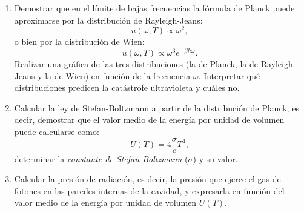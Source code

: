 \documentclass[a4paper,11pt]{article}
\begin{document}
\begin{enumerate}[label=(\alph*),
                  leftmargin=2\parindent,
                  rightmargin=2\parindent]
     \item{Demostrar que en el límite de bajas frecuencias la fórmula de 
           Planck puede aproximarse por la distribución de Rayleigh-Jeans:
           $$ u(\omega, T) \propto \omega^2, $$
           o bien por la distribución de Wien:
           $$ u(\omega, T) \propto \omega^3 e^{-\beta \hbar \omega}. $$
           Realizar una gráfica de las tres distribuciones (la de Planck, la 
           de Rayleigh-Jeans y la de Wien) en función de la frecuencia 
           $\omega$.
           Interpretar qué distribuciones predicen la catástrofe 
           ultravioleta y cuáles no.
           }
     
     \item{Calcular la ley de Stefan-Boltzmann a partir de la distribución 
           de Planck, es decir, demostrar que el valor medio de la energía 
           por unidad de volumen puede calcularse como:
           $$ U(T) = 4 \frac{\sigma}{c} T^4, $$
           determinar la \emph{constante de Stefan-Boltzmann} ($\sigma$) y su 
           valor.
           }
     
     \item{Calcular la presión de radiación, es decir, la presión que 
           ejerce el gas de fotones en las paredes internas de la cavidad, y 
           expresarla en función del valor medio de la energía por unidad de 
           volumen $U(T)$.
           }

\end{enumerate}
\end{document}
